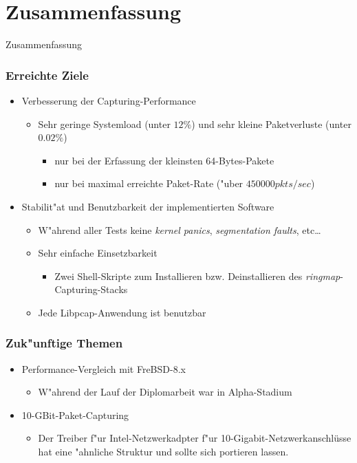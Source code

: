 \documentclass{beamer}
\begin{document}
\section{Zusammenfassung}
\begin{frame}
	\begin{center}
	\huge{Zusammenfassung}
	\end{center}
\end{frame}
\begin{frame}
\frametitle{Erreichte Ziele}
\begin{itemize}
	\item Verbesserung der Capturing-Performance
		\begin{itemize}
			\item Sehr geringe Systemload (unter $12\%$) und sehr kleine
				Paketverluste (unter  $0.02\%$)
				\begin{itemize}
					\item nur bei der Erfassung der kleinsten 64-Bytes-Pakete
					\item nur bei maximal erreichte Paket-Rate ("uber $450000 pkts/sec$) 
				\end{itemize}
		\end{itemize}
	\item Stabilit"at und Benutzbarkeit der implementierten Software
		\begin{itemize}
			\item W"ahrend aller Tests keine \emph{kernel panics}, \emph{segmentation faults}, etc\ldots
			\item Sehr einfache Einsetzbarkeit
				\begin{itemize}
					\item Zwei Shell-Skripte zum Installieren bzw. Deinstallieren des 
						\emph{ringmap}-Capturing-Stacks
				\end{itemize}
			\item Jede Libpcap-Anwendung ist benutzbar
		\end{itemize}
\end{itemize}
\end{frame}

\begin{frame}
\frametitle{Zuk"unftige Themen}
\begin{itemize}
	\item Performance-Vergleich mit FreBSD-8.x
		\begin{itemize}
			\item W"ahrend der Lauf der Diplomarbeit war in Alpha-Stadium\newline
		\end{itemize}
	\item 10-GBit-Paket-Capturing
		\begin{itemize}
			\item Der Treiber f"ur Intel-Netzwerkadpter f"ur 10-Gigabit-Netzwerkanschlüsse hat 
				eine "ahnliche Struktur und sollte sich portieren lassen. 
		\end{itemize}
\end{itemize}
\end{frame}
\end{document}
